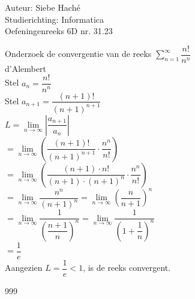 \documentclass[a4paper]{article}
\begin{document}
\noindent \large Auteur: Siebe Haché \\
\noindent \large Studierichting: Informatica \\
\noindent \large Oefeningenreeks 6D nr. 31.23\\

\medskip
\normalsize

Onderzoek de convergentie van de reeks $\displaystyle\sum_{n=1}^{\infty}\dfrac{n!}{n^n}$ \\

d'Alembert\\

Stel $a_n = \dfrac{n!}{n^n}$\\

Stel $a_{n+1} = \dfrac{(n+1)!}{(n+1)^{n+1}}$\\

$L = \lim\limits_{n \to \infty} \left| \dfrac{a_{n+1}}{a_n} \right|$\\

$= \lim\limits_{n \to \infty} \left( \dfrac{(n+1)!}{(n+1)^{n+1}} \cdot \dfrac{n^n}{n!} \right)$ \\

$= \lim\limits_{n \to \infty} \left( \dfrac{(n+1) \cdot n!}{(n+1) \cdot (n+1)^n} \cdot \dfrac{n^n}{n!} \right) $\\

$= \lim\limits_{n \to \infty} \dfrac{n^n}{(n+1)^n} = \lim\limits_{n \to \infty} \left( \dfrac{n}{n+1} \right)^n$ \\

$= \lim\limits_{n \to \infty} \dfrac{1}{\left( \dfrac{n+1}{n} \right)^n} = \lim\limits_{n \to \infty} \dfrac{1}{\left( 1 + \dfrac{1}{n} \right)^n}$\\

$= \dfrac{1}{e}$\\

Aangezien $L = \dfrac{1}{e} < 1$, is de reeks convergent.\\

\begin{thebibliography}{999}
\end{thebibliography}
\end{document}
